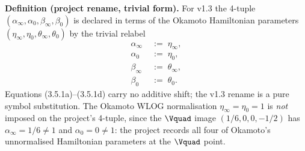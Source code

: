\medskip
\noindent\textbf{Definition (project rename, trivial form).}%
\hspace{0.5em}
For v1.3 the 4-tuple
$(\alpha_\infty, \alpha_0, \beta_\infty, \beta_0)$ is declared
in terms of the Okamoto Hamiltonian parameters
$(\eta_\infty, \eta_0, \theta_\infty, \theta_0)$ by the
trivial relabel
\begin{align}
  \alpha_\infty   &\;:=\; \eta_\infty,
                                           \tag{3.5.1a}\\
  \alpha_0        &\;:=\; \eta_0,
                                           \tag{3.5.1b}\\
  \beta_\infty    &\;:=\; \theta_\infty,
                                           \tag{3.5.1c}\\
  \beta_0         &\;:=\; \theta_0.
                                           \tag{3.5.1d}
\end{align}
Equations (3.5.1a)--(3.5.1d) carry no additive shift; the
v1.3 rename is a pure symbol substitution. The Okamoto WLOG
normalisation $\eta_\infty = \eta_0 = 1$ is {\em not} imposed
on the project's 4-tuple, since the $\Vquad$ image
$(1/6, 0, 0, -1/2)$ has $\alpha_\infty = 1/6 \ne 1$ and
$\alpha_0 = 0 \ne 1$: the project records all four of
Okamoto's unnormalised Hamiltonian parameters at the
$\Vquad$ point.

